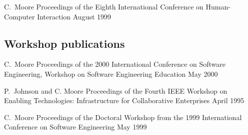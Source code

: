 \documentclass[11pt,letterpaper,sans]{moderncv} %
\begin{document}
          {C.~Moore}
          {Proceedings of the Eighth International Conference on
            Human-Computer Interaction}
          {August 1999}

\subsection{Workshop publications}

          {C.~Moore}
          {Proceedings of the 2000 International Conference on
            Software Engineering, Workshop on Software Engineering
            Education}
          {May 2000}

          {P.~Johnson and C. Moore}
          {Proceedings of the Fourth IEEE Workshop on Enabling Technologies: Infrastructure for Collaborative Enterprises}
          {April 1995}

          {C.~Moore}
          {Proceedings of the Doctoral Workshop from the 1999
            International Conference on Software Engineering}
          {May 1999}



\end{document}
